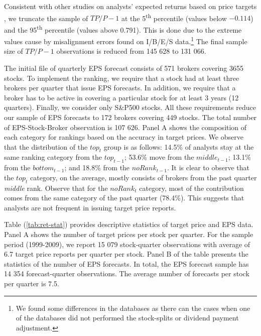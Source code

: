 \documentclass{article}\usepackage[]{graphicx}\usepackage[]{color}
\begin{document}
Consistent with other studies on analysts' expected returns based on price targets  \citep{bradshaw2002,brav2003,da2011}, we truncate the sample of $TP/P-1$ at the 5\textsuperscript{th} percentile (values below \ensuremath{-0.114}) and the 95\textsuperscript{th} percentile (values above 0.791). This is done due to the extreme values cause by misalignment errors found on I/B/E/S data.\footnote{We found some differences in the databases as there can the cases when one of the databases did not performed the stock-splits or dividend payment adjustment.} The final sample size of $TP/P-1$ observations is reduced from 145 628 to 131 066.

The initial file of quarterly EPS forecast consists of  571 brokers covering 3655 stocks. To implement the ranking, we require that a stock had at least three brokers per quarter that issue EPS forecasts. In addition, we require that a broker has to be active in covering a particular stock for at least 3 years (12 quarters). Finally, we consider only S\&P500 stocks. All these requirements reduce our sample of EPS forecasts to 172 brokers covering 449 stocks. The total number of EPS-Stock-Broker observation is 107 626.
Panel A shows the composition of each category for rankings based on the accuracy in target prices. We observe that the distribution of the $top_{t}$ group is as follows: 14.5\%  of analysts stay at the same ranking category from the $top_{t-1}$; 53.6\% move from the $middle_{t-1}$; 13.1\% from the $bottom_{t-1}$; and 18.8\%  from the $noRank_{t-1}$. It is clear to observe that the $top_{t}$ category, on the average, mostly consists of brokers from the past quarter \emph{middle} rank. Observe that for the $noRank_{t}$ category, most of the contribution comes from the same category of the past quarter (78.4\%). This suggests that analysts are not frequent in issuing target price reports. 


Table (\ref{tab:ret-stat}) provides descriptive statistics of target price and EPS data. Panel A shows the number of target prices per stock per quarter. For the sample period (1999-2009), we report 15 079 stock-quarter observations with average of 6.7 target price reports per quarter per stock. Panel B of the table presents the statistics of the number of EPS forecasts. In total, the EPS forecast sample has 14 354 forecast-quarter observations. The average number of forecasts per stock per quarter is 7.5.
\end{document}
